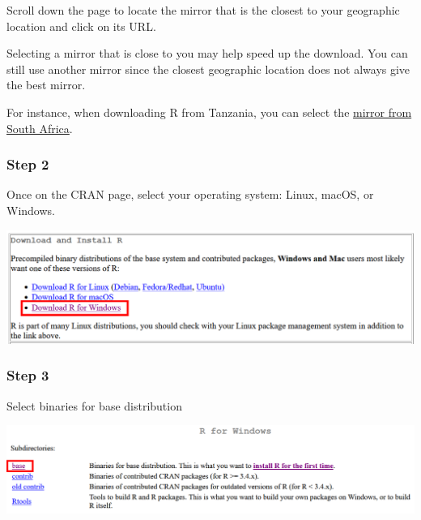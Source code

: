 \documentclass[
  letterpaper,
  DIV=11,
  numbers=noendperiod]{scrreprt}
\begin{document}
Scroll down the page to locate the mirror that is the closest to your
geographic location and click on its URL.

\begin{tcolorbox}[enhanced jigsaw, bottomtitle=1mm, title=\textcolor{quarto-callout-tip-color}{\faLightbulb}\hspace{0.5em}{Tip}, toptitle=1mm, toprule=.15mm, breakable, colframe=quarto-callout-tip-color-frame, coltitle=black, rightrule=.15mm, arc=.35mm, left=2mm, opacitybacktitle=0.6, colback=white, colbacktitle=quarto-callout-tip-color!10!white, bottomrule=.15mm, opacityback=0, titlerule=0mm, leftrule=.75mm]
Selecting a mirror that is close to you may help speed up the download.
You can still use another mirror since the closest geographic location
does not always give the best mirror.
\end{tcolorbox}

For instance, when downloading R from Tanzania, you can select the
\href{https://cran.mirror.ac.za/}{mirror from South Africa}.

\hypertarget{step-2}{%
\subsubsection{Step 2}\label{step-2}}

Once on the CRAN page, select your operating system: Linux, macOS, or
Windows.

\includegraphics{./images/paste-23A4B16E.png}

\hypertarget{step-3}{%
\subsubsection{Step 3}\label{step-3}}

Select binaries for base distribution

\includegraphics{./images/paste-0739A4C1.png}
\end{document}
